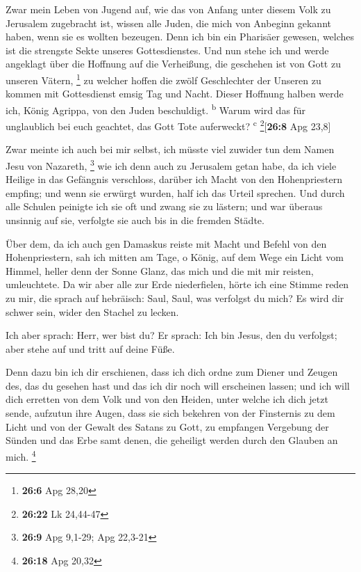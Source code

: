  Zwar mein Leben von Jugend auf, wie das von Anfang unter
diesem Volk zu Jerusalem zugebracht ist, wissen alle Juden,
 die mich von Anbeginn gekannt haben, wenn sie es wollten
bezeugen. Denn ich bin ein Pharisäer gewesen, welches ist die strengste
Sekte unseres Gottesdienstes.  Und nun stehe ich und werde
angeklagt über die Hoffnung auf die Verheißung, die geschehen ist von
Gott zu unseren Vätern, \footnote{\textbf{26:6} Apg 28,20}
 zu welcher hoffen die zwölf Geschlechter der Unseren zu
kommen mit Gottesdienst emsig Tag und Nacht. Dieser Hoffnung halben
werde ich, König Agrippa, von den Juden beschuldigt. \textsuperscript{b}
 Warum wird das für unglaublich bei euch geachtet, das
Gott Tote auferweckt? \textsuperscript{c} \footnote{\textbf{26:22} Lk
  24,44-47}{[}\textbf{26:8} Apg 23,8{]}

 Zwar meinte ich auch bei mir selbst, ich müsste viel
zuwider tun dem Namen Jesu von Nazareth, \footnote{\textbf{26:9} Apg
  9,1-29; Apg 22,3-21}  wie ich denn auch zu Jerusalem
getan habe, da ich viele Heilige in das Gefängnis verschloss, darüber
ich Macht von den Hohenpriestern empfing; und wenn sie erwürgt wurden,
half ich das Urteil sprechen.  Und durch alle Schulen
peinigte ich sie oft und zwang sie zu lästern; und war überaus unsinnig
auf sie, verfolgte sie auch bis in die fremden Städte.

 Über dem, da ich auch gen Damaskus reiste mit Macht und
Befehl von den Hohenpriestern,  sah ich mitten am Tage, o
König, auf dem Wege ein Licht vom Himmel, heller denn der Sonne Glanz,
das mich und die mit mir reisten, umleuchtete.  Da wir
aber alle zur Erde niederfielen, hörte ich eine Stimme reden zu mir, die
sprach auf hebräisch: Saul, Saul, was verfolgst du mich? Es wird dir
schwer sein, wider den Stachel zu lecken.

 Ich aber sprach: Herr, wer bist du? Er sprach: Ich bin
Jesus, den du verfolgst; aber stehe auf und tritt auf deine Füße.

 Denn dazu bin ich dir erschienen, dass ich dich ordne
zum Diener und Zeugen des, das du gesehen hast und das ich dir noch will
erscheinen lassen;  und ich will dich erretten von dem
Volk und von den Heiden, unter welche ich dich jetzt sende,
 aufzutun ihre Augen, dass sie sich bekehren von der
Finsternis zu dem Licht und von der Gewalt des Satans zu Gott, zu
empfangen Vergebung der Sünden und das Erbe samt denen, die geheiligt
werden durch den Glauben an mich. \footnote{\textbf{26:18} Apg 20,32}

